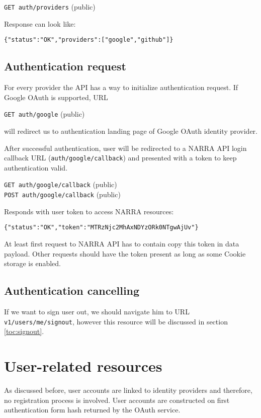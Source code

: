 \documentclass{book}
\newcommand{\request}[2]{{\color{blue}\texttt{#1} (#2)}}
\begin{document}
\request{GET auth/providers}{public}

Response can look like:

\begin{verbatim}
{"status":"OK","providers":["google","github"]}
\end{verbatim}

\subsection{Authentication request}
For every provider the API has a way to initialize authentication request. If Google OAuth is supported, URL

\request{GET auth/google}{public}

will redirect us to authentication landing page of Google OAuth identity provider.

After successful authentication, user will be redirected to a NARRA API login callback URL (\texttt{auth/google/callback}) and presented with a token to keep authentication valid.

\request{GET auth/google/callback}{public}\\
\request{POST auth/google/callback}{public}

Responds with user token to access NARRA resources:

\begin{verbatim}
{"status":"OK","token":"MTRzNjc2MhAxNDYzORk0NTgwAjUv"}
\end{verbatim}

At least first request to NARRA API has to contain copy this token in data payload. Other requests should have the token present as long as some Cookie storage is enabled.

\subsection{Authentication cancelling}
If we want to sign user out, we should navigate him to URL \texttt{v1/users/me/signout}, however this resource will be discussed in section \ref{toc:signout}.

\section{User-related resources}
As discussed before, user accounts are linked to identity providers and therefore, no registration process is involved. User accounts are constructed on first authentication form hash returned by the OAuth service.
\end{document}
